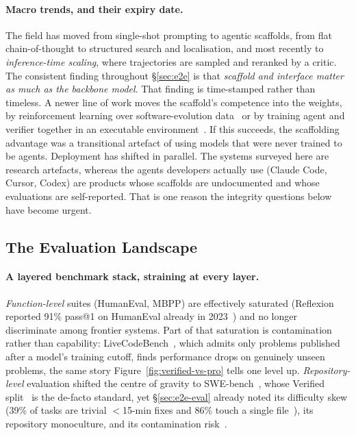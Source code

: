 \documentclass[
  english,        %
  font=times,     %
  twocolumn,      %
]{tumarticle}
\begin{document}
\paragraph{Macro trends, and their expiry date.}
The field has moved from single-shot prompting to agentic scaffolds, from flat
chain-of-thought to structured search and localisation, and most recently to
\emph{inference-time scaling}, where trajectories are sampled and reranked by a
critic. The consistent finding throughout \S\ref{sec:e2e} is that \emph{scaffold and
interface matter as much as the backbone model}. That finding is time-stamped rather than
timeless. A newer line of work moves the scaffold's competence into the weights,
by reinforcement learning over software-evolution data~\cite{wei2025swerl} or by
training agent and verifier together in an executable
environment~\cite{pan2024swegym}. If this succeeds, the scaffolding advantage was
a transitional artefact of using models that were never trained to be agents.
Deployment has shifted in parallel. The systems surveyed here are research
artefacts, whereas the agents developers actually use (Claude Code, Cursor, Codex)
are products whose scaffolds are undocumented and whose evaluations are
self-reported. That is one reason the integrity questions below have become
urgent.

\subsection{The Evaluation Landscape}
\label{sec:eval-landscape}
\paragraph{A layered benchmark stack, straining at every layer.}
\emph{Function-level} suites (HumanEval, MBPP) are effectively saturated
(Reflexion reported 91\% pass@1 on HumanEval already in
2023~\cite{shinn2023reflexion}) and no longer discriminate among frontier systems.
Part of that saturation is contamination rather than capability:
LiveCodeBench~\cite{jain2025livecodebench}, which admits only problems published
after a model's training cutoff, finds performance drops on genuinely unseen
problems, the same story Figure~\ref{fig:verified-vs-pro} tells one level up.
\emph{Repository-level} evaluation shifted the centre of gravity to
SWE-bench~\cite{jimenez2024swebench}, whose Verified
split~\cite{openai2024verified} is the de-facto standard, yet \S\ref{sec:e2e-eval}
already noted its difficulty skew (39\% of tasks are trivial $<$15-min fixes and
86\% touch a single file~\cite{ganhotra2025difficulty}), its repository monoculture,
and its contamination risk~\cite{epoch2025swebench}.
\end{document}
